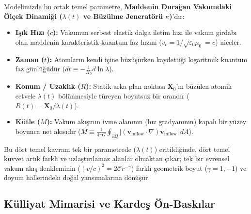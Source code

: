 Modelimizde bu ortak temel parametre, \textbf{Maddenin Durağan Vakumdaki Ölçek Dinamiği ($\lambda(t)$ ve Büzülme Jeneratörü $\kappa$)}'dır:
\begin{itemize}
      \item \textbf{Işık Hızı ($c$):} Vakumun serbest elastik dalga iletim hızı ile vakum girdabı olan maddenin karakteristik kuantum faz hızını ($v_c = 1/\sqrt{\varepsilon_0\mu_0} = c$) niceler.
      \item \textbf{Zaman ($t$):} Atomların kendi içine büzüşürken kaydettiği logaritmik kuantum faz günlüğüdür ($dt \equiv -\frac{1}{H_0} d\ln\lambda$).
      \item \textbf{Konum / Uzaklık ($R$):} Statik arka plan noktası $\mathbf{X}_0$'ın büzülen atomik cetvele $\lambda(t)$ bölünmesiyle türeyen boyutsuz bir orandır ($R(t) = \mathbf{X}_0 / \lambda(t)$).
      \item \textbf{Kütle ($M$):} Vakum akışının ivme alanının (hız gradyanının) kapalı bir yüzey boyunca net akısıdır ($M \equiv \frac{1}{4\pi G} \oint_{\partial \Omega} |(\mathbf{v}_{\mathrm{inflow}} \cdot \nabla) \mathbf{v}_{\mathrm{inflow}}| \, dA$).
\end{itemize}

Bu dört temel kavram tek bir parametrede ($\lambda(t)$) eritildiğinde, dört temel kuvvet artık farklı ve uzlaştırılamaz alanlar olmaktan çıkar; tek bir evrensel vakum akış denkleminin ($(v/c)^2 = 2\mathcal{C}r^{-\gamma}$) farklı geometrik boyut ($\gamma=1, -1$) ve doyum hallerindeki doğal yansımalarına dönüşür.

\subsection{Külliyat Mimarisi ve Kardeş Ön-Baskılar}
\label{sec:kulliyat_mimarisi}

